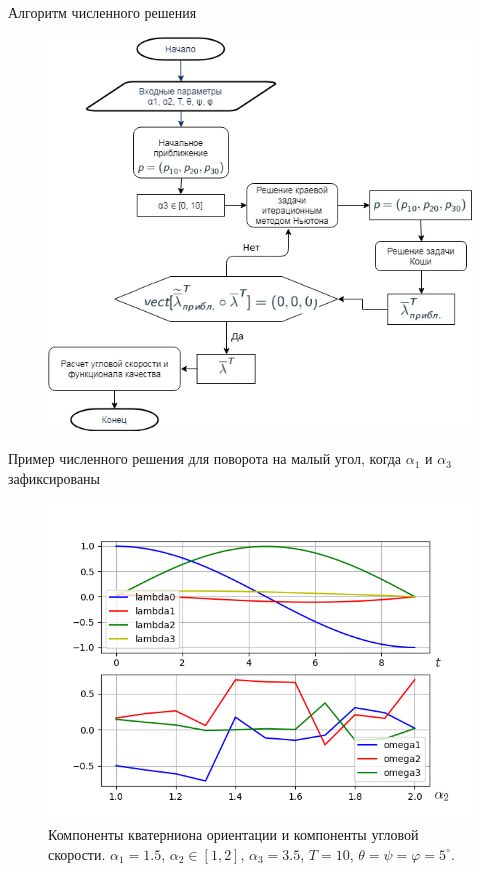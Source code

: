 \documentclass[10pt,utf8,presentation,notheorems,xcolor=dvipsnames,compress]{beamer}
\renewcommand{\phi}{\varphi} %
\begin{document}
\begin{frame}[t]{Алгоритм численного решения} \vspace{4pt}
\begin{figure}[H]
\center\includegraphics[scale=0.5]{fig/scheme.png}
\end{figure}
\end{frame}

\begin{frame}{Пример численного решения для поворота на малый угол, когда $\alpha_1$ и $\alpha_3$ зафиксированы}
\begin{figure}[H]
\center\includegraphics[scale=0.5]{fig/ivp_and_control_alpha2_1-2_5.png}
\caption{Компоненты кватерниона ориентации и компоненты угловой скорости. $\alpha_1 = 1.5$, $\alpha_2 \in [1, 2]$, $\alpha_3 = 3.5$, $\textit{T} = 10$, $\theta = \psi = \phi = 5^{\circ}$.}
\end{figure}
\end{frame}
\end{document}
